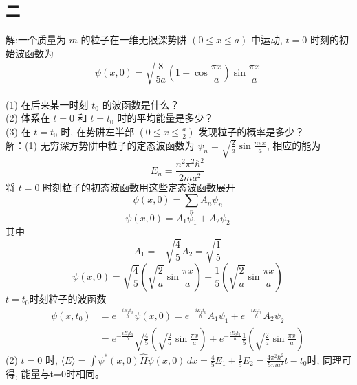 \subsection{二}
解:一个质量为 $m$ 的粒子在一维无限深势阱 $(0 \leq x \leq a)$ 中运动, $t = 0$ 时刻的初始波函数为
$$\psi(x, 0) = \sqrt{\frac{8}{5a}} \left(1 + \cos \frac{\pi x}{a}\right)\sin \frac{\pi x}{a}~$$\\
(1) 在后来某一时刻 $t_0$ 的波函数是什么？\\
(2) 体系在 $t = 0$ 和 $t = t_0$ 时的平均能量是多少？\\
(3) 在 $t = t_0$ 时, 在势阱左半部 $(0 \leq x \leq \frac{a}{2})$ 发现粒子的概率是多少？\\
解：(1) 无穷深方势阱中粒子的定态波函数为 $\psi_n = \sqrt{\frac{2}{a}} \sin \frac{n\pi x}{a}$, 相应的能为 
$$E_n = \frac{n^2 \pi^2 \hbar^2}{2ma^2}~$$
将 $t = 0$ 时刻粒子的初态波函数用这些定态波函数展开
$$\psi(x, 0) = \sum_n A_n \psi_n~$$
$$\psi(x, 0) = A_1 \psi_1 + A_2 \psi_2~$$
其中 
$$A_1 = -\sqrt{\frac{4}{5}} A_2 = \sqrt{\frac{1}{5}}~$$
$$\psi(x, 0) = \sqrt{\frac{4}{5}}\left(\sqrt{\frac{2}{a}}\sin \frac{\pi x}{a}\right)+\frac{1}{5}\left(\sqrt{\frac{2}{a}}\sin \frac{\pi x}{a}\right)~$$
$t=t_0$时刻粒子的波函数
\begin{align}
\psi(x,t_0) &= e^{-\frac{iE_1t_0}{\hbar}} \psi(x, 0) = e^{-\frac{iE_1t_0}{\hbar}} A_1 \psi_1 + e^{-\frac{iE_2t_0}{\hbar}} A_2 \psi_2 \\
&= e^{-\frac{iE_1t_0}{\hbar}} \sqrt{\frac{4}{5}}\left(\sqrt{\frac{2}{a}}\sin \frac{\pi x}{a}\right)+ e^{-\frac{iE_2t_0}{\hbar}}\frac{1}{5}\left(\sqrt{\frac{2}{a}}\sin \frac{\pi x}{a}\right)~
\end{align}
(2) $t=0$ 时, $\langle E \rangle = \int \psi^*(x, 0) \hat{H} \psi(x, 0) \,dx = \frac{4}{5} E_1 + \frac{1}{5} E_2 = \frac{4\pi^2 \hbar^2}{5ma^2} t - t_0$时,
同理可得, 能量与t=0时相同。
